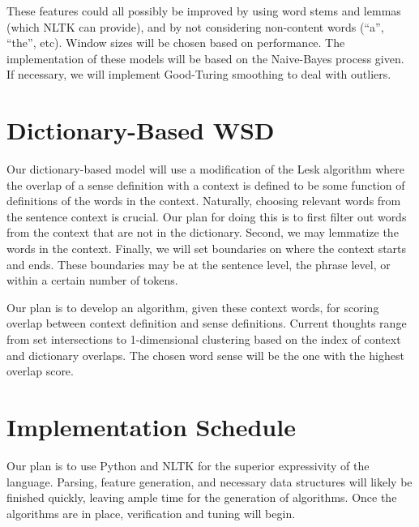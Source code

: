 \documentclass[11pt]{article}
\begin{document}
These features could all possibly be improved by using word stems and lemmas (which NLTK can provide), and by not considering non-content words (``a'', ``the'', etc). Window sizes will be chosen based on performance. The implementation of these models will be based on the Naive-Bayes process given. If necessary, we will implement Good-Turing smoothing to deal with outliers.

\section{Dictionary-Based WSD}
Our dictionary-based model will use a modification of the Lesk algorithm where the overlap of a sense definition with a context is defined to be some function of definitions of the words in the context. Naturally, choosing relevant words from the sentence context is crucial. Our plan for doing this is to first filter out words from the context that are not in the dictionary. Second, we may lemmatize the words in the context. Finally, we will set boundaries on where the context starts and ends. These boundaries may be at the sentence level, the phrase level, or within a certain number of tokens.

Our plan is to develop an algorithm, given these context words, for scoring overlap between context definition and sense definitions. Current thoughts range from set intersections to 1-dimensional clustering based on the index of context and dictionary overlaps. The chosen word sense will be the one with the highest overlap score.

\section{Implementation Schedule}
Our plan is to use Python and NLTK for the superior expressivity of the language. Parsing, feature generation, and necessary data structures will likely be finished quickly, leaving ample time for the generation of algorithms. Once the algorithms are in place, verification and tuning will begin.
\end{document}
